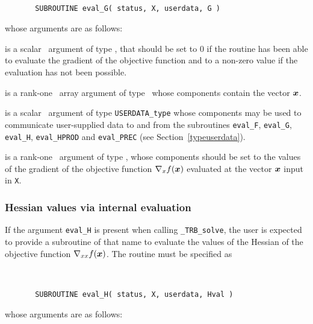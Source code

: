 \documentclass{galahad}
\newcommand{\packagename}{TRB}
\newcommand{\fullpackagename}{\libraryname\_\packagename}
\newcommand{\solver}{{\tt \fullpackagename\_solve}}
\begin{document}
\def\baselinestretch{0.8}
{\tt
\begin{verbatim}
       SUBROUTINE eval_G( status, X, userdata, G )
\end{verbatim} }
\def\baselinestretch{1.0}
\noindent whose arguments are as follows:

\begin{description}
 is a scalar \intentout\ argument of type \integer,
that should be set to 0 if the routine has been able to evaluate
the gradient of the objective function
and to a non-zero value if the evaluation has not been possible.

 is a rank-one \intentin\ array argument of type \realdp\
whose components contain the vector ${\bm{x}}$.

 is a scalar \intentinout\ argument of type
{\tt USERDATA\_type} whose components may be used
to communicate user-supplied data to and from the
subroutines {\tt eval\_F}, {\tt eval\_G},
{\tt eval\_H}, {\tt eval\_HPROD} and {\tt eval\_PREC}
(see Section~\ref{typeuserdata}).

 is a rank-one \intentout\ argument of type \realdp,
whose components should be set to the values of the gradient
of the objective function $\nabla_x f({\bm{x}})$
evaluated at the vector ${\bm{x}}$ input in {\tt X}.

\end{description}


\subsubsection{Hessian values via internal evaluation\label{hfv}}

If the argument {\tt eval\_H} is present when calling \solver, the
user is expected to provide a subroutine of that name to evaluate the
values of the Hessian of the objective function $\nabla_{xx} f({\bm{x}})$.
The routine must be specified as

\def\baselinestretch{0.8}
{\tt
\begin{verbatim}
       SUBROUTINE eval_H( status, X, userdata, Hval )
\end{verbatim} }
\def\baselinestretch{1.0}
\noindent whose arguments are as follows:
\end{document}
